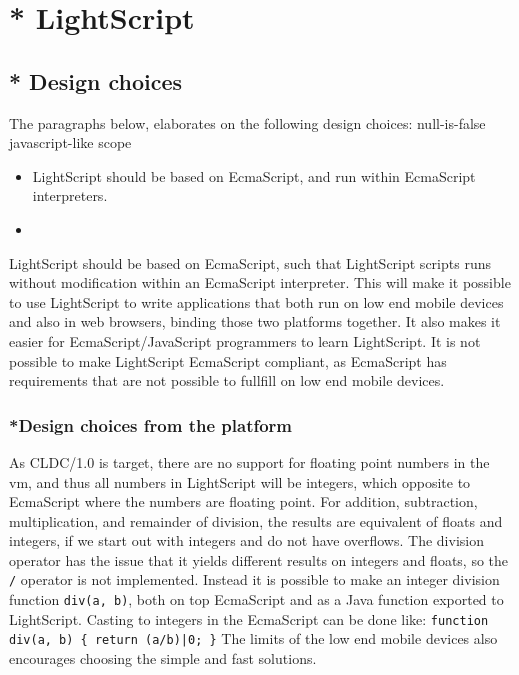 \chapter{* LightScript}
\label{lightscript}
\section{* Design choices}

The paragraphs below, elaborates on the following design choices:
null-is-false
javascript-like scope

\begin{itemize}
\item LightScript should be based on EcmaScript, and run within EcmaScript interpreters.
\item 
\end{itemize}

LightScript should be based on EcmaScript, such that LightScript scripts runs without modification within an EcmaScript interpreter. 
This will make it possible to use LightScript to write applications that both run on low end mobile devices and also in web browsers, binding those two platforms together.
It also makes it easier for EcmaScript/JavaScript programmers to learn LightScript.
It is not possible to make LightScript EcmaScript compliant, as EcmaScript has requirements that are not possible to fullfill on low end mobile devices.

\subsection{*Design choices from the platform}

As CLDC/1.0 is target, there are no support for floating point numbers in the vm,
and thus all numbers in LightScript will be integers, which opposite to EcmaScript
where the numbers are floating point.
For addition, subtraction, multiplication, and remainder of division, the results are equivalent of floats and integers, if we start out with integers and do not have overflows. The division operator has the issue that it yields different results on integers and floats, so the \verb|/| operator is not implemented. Instead it is possible to make an integer division function \verb|div(a, b)|, both on top EcmaScript and as a Java function exported to LightScript.
Casting to integers in the EcmaScript can be done like:
\verb~function div(a, b) { return (a/b)|0; }~
The limits of the low end mobile devices also encourages choosing the simple and fast solutions.

